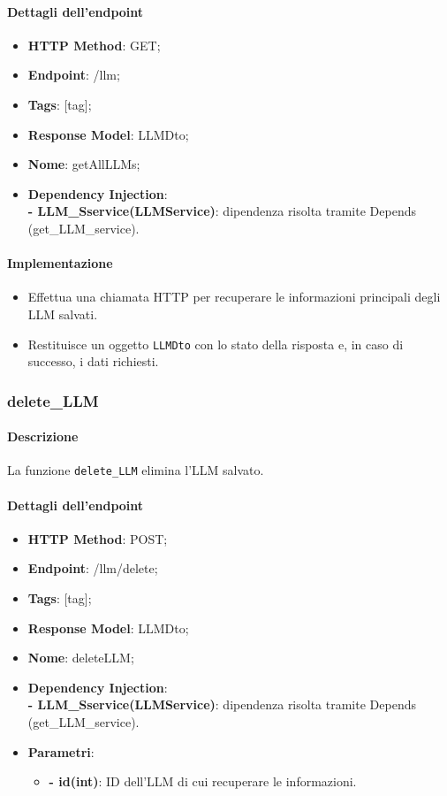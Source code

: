 \paragraph{Dettagli dell'endpoint}
\begin{itemize}
    \item \textbf{HTTP Method}: GET;
    \item \textbf{Endpoint}: /llm;
    \item \textbf{Tags}: [tag];
    \item \textbf{Response Model}: LLMDto;
    \item \textbf{Nome}: getAllLLMs;
    \item \textbf{Dependency Injection}:\\ \textbf{- LLM\_Sservice(LLMService)}: dipendenza risolta tramite Depends (get\_LLM\_service).
\end{itemize}

\paragraph{Implementazione}
\begin{itemize}
    \item Effettua una chiamata HTTP per recuperare le informazioni principali degli LLM salvati.
    \item Restituisce un oggetto \texttt{LLMDto} con lo stato della risposta e, in caso di successo, i dati richiesti.
\end{itemize}


\subsubsection{delete\_LLM}
\label{sec:delete_LLM}

\paragraph{Descrizione}
La funzione \texttt{delete\_LLM} elimina l'LLM salvato.

\paragraph{Dettagli dell'endpoint}
\begin{itemize}
    \item \textbf{HTTP Method}: POST;
    \item \textbf{Endpoint}: /llm/delete;
    \item \textbf{Tags}: [tag];
    \item \textbf{Response Model}: LLMDto;
    \item \textbf{Nome}: deleteLLM;
    \item \textbf{Dependency Injection}:\\ \textbf{- LLM\_Sservice(LLMService)}: dipendenza risolta tramite Depends (get\_LLM\_service).
    \item \textbf{Parametri}:    
    \begin{itemize}
        \item \textbf{- id(int)}: ID dell'LLM di cui recuperare le informazioni.
    \end{itemize}
\end{itemize}

